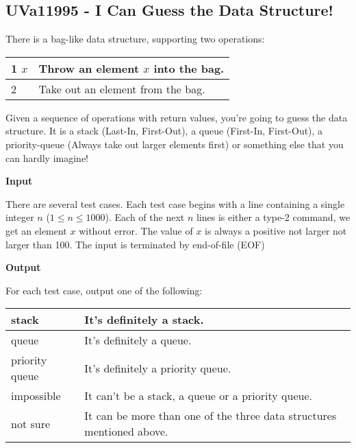 \subsection{UVa11995 - I Can Guess the Data Structure!}
There is a bag-like data structure, supporting two operations:
\begin{center}
\begin{tabular}[c]{| l | l |}
\hline
1 $x$ & Throw an element $x$ into the bag.\\
\hline
2 & Take out an element from the bag.\\
\hline
\end{tabular}
\end{center}
Given a sequence of operations with return values, you're going to guess the data structure. It is a stack (Last-In, First-Out), a queue (First-In, First-Out), a priority-queue (Always take out larger elements first) or something else that you can hardly imagine!

\begin{flushleft}
{\color{red} \textbf{Input}}
\end{flushleft}
There are several test cases. Each test case begins with a line containing a single integer $n$ ($1 \leq n \leq 1000$). Each of the next $n$ lines is either a type-2 command, we get an element $x$ without error. The value of $x$ is always a positive not larger not larger than 100. The input is terminated by end-of-file (EOF)

\begin{flushleft}
{\color{red} \textbf{Output}}
\end{flushleft}
For each test case, output one of the following:
\begin{center}
\begin{tabular}[c]{| l | l |}
\hline
stack & It's definitely a stack.\\
\hline
queue & It's definitely a queue.\\
\hline
priority queue & It's definitely a priority queue.\\
\hline
impossible & It can't be a stack, a queue or a priority queue.\\
\hline
not sure & It can be more than one of the three data structures mentioned above.\\
\hline
\end{tabular}
\end{center}

